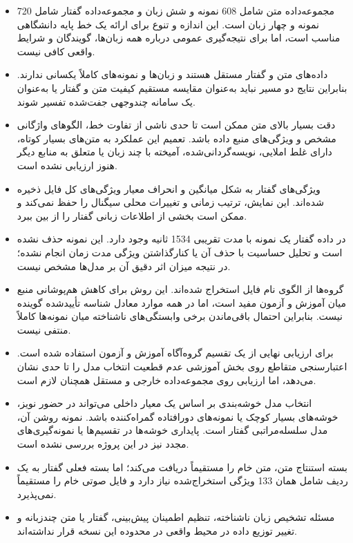 \begin{itemize}
	\item مجموعه‌داده متن شامل 608 نمونه و شش زبان و مجموعه‌داده گفتار شامل 720 نمونه و چهار زبان است. این اندازه و تنوع برای ارائه یک خط پایه دانشگاهی مناسب است، اما برای نتیجه‌گیری عمومی درباره همه زبان‌ها، گویندگان و شرایط واقعی کافی نیست.

	\item داده‌های متن و گفتار مستقل هستند و زبان‌ها و نمونه‌های کاملاً یکسانی ندارند. بنابراین نتایج دو مسیر نباید به‌عنوان مقایسه مستقیم کیفیت متن و گفتار یا به‌عنوان یک سامانه چندوجهی جفت‌شده تفسیر شوند.

	\item دقت بسیار بالای متن ممکن است تا حدی ناشی از تفاوت خط، الگوهای واژگانی مشخص و ویژگی‌های منبع داده باشد. تعمیم این عملکرد به متن‌های بسیار کوتاه، دارای غلط املایی، نویسه‌گردانی‌شده، آمیخته با چند زبان یا متعلق به منابع دیگر هنوز ارزیابی نشده است.

	\item ویژگی‌های گفتار به شکل میانگین و انحراف معیار ویژگی‌های کل فایل ذخیره شده‌اند. این نمایش، ترتیب زمانی و تغییرات محلی سیگنال را حفظ نمی‌کند و ممکن است بخشی از اطلاعات زبانی گفتار را از بین ببرد.

	\item در داده گفتار یک نمونه با مدت تقریبی 1534 ثانیه وجود دارد. این نمونه حذف نشده است و تحلیل حساسیت با حذف آن یا کنارگذاشتن ویژگی مدت زمان انجام نشده؛ در نتیجه میزان اثر دقیق آن بر مدل‌ها مشخص نیست.

	\item گروه‌ها از الگوی نام فایل استخراج شده‌اند. این روش برای کاهش هم‌پوشانی منبع میان آموزش و آزمون مفید است، اما در همه موارد معادل شناسه تأییدشده گوینده نیست. بنابراین احتمال باقی‌ماندن برخی وابستگی‌های ناشناخته میان نمونه‌ها کاملاً منتفی نیست.

	\item برای ارزیابی نهایی از یک تقسیم گروه‌آگاه آموزش و آزمون استفاده شده است. اعتبارسنجی متقاطع روی بخش آموزشی عدم قطعیت انتخاب مدل را تا حدی نشان می‌دهد، اما ارزیابی روی مجموعه‌داده خارجی و مستقل همچنان لازم است.

	\item انتخاب مدل خوشه‌بندی بر اساس یک معیار داخلی می‌تواند در حضور نویز، خوشه‌های بسیار کوچک یا نمونه‌های دورافتاده گمراه‌کننده باشد. نمونه روشن آن، مدل سلسله‌مراتبی گفتار است. پایداری خوشه‌ها در تقسیم‌ها یا نمونه‌گیری‌های مجدد نیز در این پروژه بررسی نشده است.

	\item بسته استنتاج متن، متن خام را مستقیماً دریافت می‌کند؛ اما بسته فعلی گفتار به یک ردیف شامل همان 133 ویژگی استخراج‌شده نیاز دارد و فایل صوتی خام را مستقیماً نمی‌پذیرد.

	\item مسئله تشخیص زبان ناشناخته، تنظیم اطمینان پیش‌بینی، گفتار یا متن چندزبانه و تغییر توزیع داده در محیط واقعی در محدوده این نسخه قرار نداشته‌اند.
\end{itemize}

